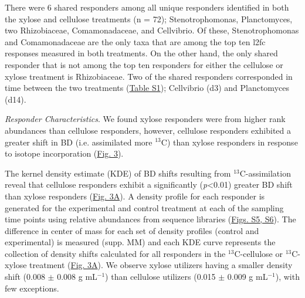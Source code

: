There were 6 shared responders among all unique responders identified in both
the xylose and cellulose treatments (n = 72); Stenotrophomonas, Planctomyces,
two Rhizobiaceae, Comamonadaceae, and Cellvibrio. Of these, Stenotrophomonas
and Comamonadaceae are the only taxa that are among the top ten l2fc responses
measured in both treatments. On the other hand, the only shared responder that
is not among the top ten responders for either the cellulose or xylose
treatment is Rhizobiaceae. Two of the shared responders corresponded in time
between the two treatments
(\href{https://authorea.com/users/3537/articles/8459/master/file/figures/resp_table/resp_table.png}{Table
S1}); Cellvibrio (d3) and Planctomyces (d14).  

\textit{Responder Characteristics}.  We found xylose responders were from
higher rank abundances than cellulose responders, however, cellulose responders
exhibited a greater shift in BD (i.e. assimilated more $^{13}$C)
than xylose responders in response to isotope incorporation
(\href{https://authorea.com/users/3537/articles/3612/master/file/figures/shift_and_rabund2/shift_and_rabund2.png}{Fig.
3}). 

The kernel density estimate (KDE) of BD shifts resulting from
$^{13}$C-assimilation reveal that cellulose responders exhibit a
significantly (\textit{p}\textless 0.01) greater BD shift than xylose
responders
(\href{https://authorea.com/users/3537/articles/3612/master/file/figures/shift_and_rabund2/shift_and_rabund2.png}{Fig.
3A}). A density profile for each responder is generated for the experimental
and control treatment at each of the sampling time points using relative
abundances from sequence libraries
(\href{https://authorea.com/users/3537/articles/8459/master/file/figures/xylose_resp_profiles/xylose_resp_profiles.png}{Figs.
S5}\href{https://authorea.com/users/3537/articles/8459/master/file/figures/cellulose_resp_profiles/cellulose_resp_profiles.png}{,
S6}). The difference in center of mass for each set of density profiles
(control and experimental) is measured (supp. MM) and each KDE curve represents
the collection of density shifts calculated for all responders in the
$^{13}$C-cellulose or $^{13}$C-xylose treatment
(\href{https://authorea.com/users/3537/articles/3612/master/file/figures/shift_and_rabund2/shift_and_rabund2.png}{Fig.
3A}). We observe xylose utilizers having a smaller density shift (0.008 $\pm$
0.008 g mL$^{-1}$) than cellulose utilizers (0.015 $\pm$ 0.009 g
mL$^{-1}$), with few exceptions. 

